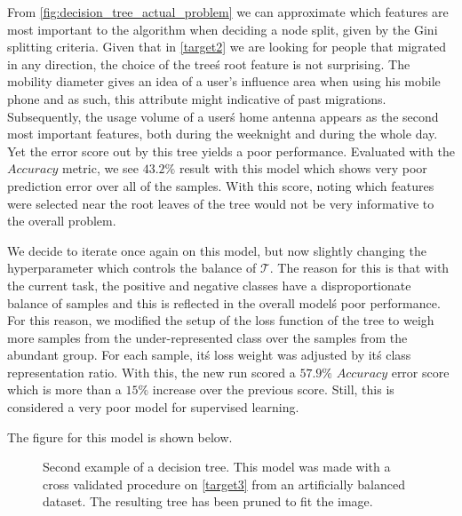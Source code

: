 \smallskip


From \cref{fig:decision_tree_actual_problem} we can approximate which features are most important to the algorithm when deciding a node split, given by the Gini splitting criteria.
Given that in \cref{target2} we are looking for people that migrated in any direction, the choice of the tree\'s root feature is not surprising.
The mobility diameter gives an idea of a user's influence area when using his mobile phone and as such, this attribute might indicative of past migrations.
Subsequently, the usage volume of a user\'s home antenna appears as the second most important features, both during the weeknight and during the whole day.
Yet the error score out by this tree yields a poor performance.
Evaluated with the $Accuracy$ metric, we see $43.2\%$ result with this model which shows very poor prediction error over all of the samples.
With this score, noting which features were selected near the root leaves of the tree would not be very informative to the overall problem.

We decide to iterate once again on this model, but now slightly changing the hyperparameter which controls the balance of $\mathcal{T}$.
The reason for this is that with the current task, the positive and negative classes have a disproportionate balance of samples and this is reflected in the overall model\'s poor performance.
For this reason, we modified the setup of the loss function of the tree to weigh more samples from the under-represented class over the samples from the abundant group.
For each sample, it\'s loss weight was adjusted by it\'s class representation ratio.
With this, the new run scored a $57.9\%$ $Accuracy$ error score which is more than a $15\%$ increase over the previous score.
Still, this is considered a very poor model for supervised learning.

The figure for this model is shown below.

\bigskip

\begin{figure}
	\centering
	\caption{ Second example of a decision tree.
		This model was made with a cross validated procedure on \cref{target3} from an artificially balanced dataset.
		The resulting tree has been pruned to fit the image.}
	\label{fig:decision_tree_actual_problem2}
\end{figure}


